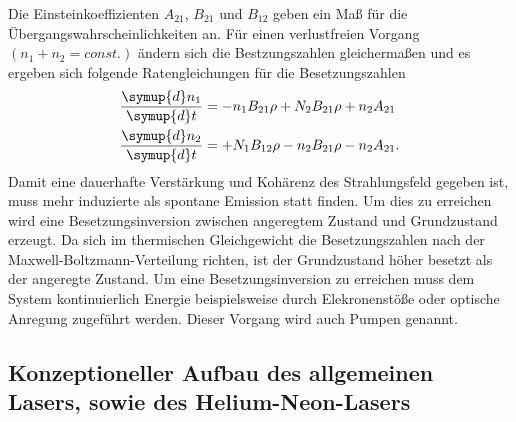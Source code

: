 Die Einsteinkoeffizienten $A_21$, $B_21$ und $B_12$
geben ein Maß für die Übergangswahrscheinlichkeiten an.
Für einen verlustfreien Vorgang
$(n_1+n_2=const.)$ ändern sich die Bestzungszahlen
gleichermaßen und es ergeben sich folgende
Ratengleichungen für die Besetzungszahlen
\begin{align}
\frac{\symup{d} n_1}{\symup{d} t} &=-n_1 B_{21}\rho + N_2 B_{21} \rho + n_2 A_{21}\\
\frac{\symup{d} n_2}{\symup{d} t} &=+N_1 B_{12}\rho - n_2 B_{21} \rho - n_2 A_{21}.
\end{align}
Damit eine dauerhafte Verstärkung
und Kohärenz des Strahlungsfeld gegeben ist,
muss mehr induzierte als spontane Emission
statt finden. Um dies zu
erreichen wird eine Besetzungsinversion
zwischen angeregtem Zustand und Grundzustand
erzeugt.
Da sich im thermischen Gleichgewicht
die Besetzungszahlen nach der
Maxwell-Boltzmann-Verteilung
richten, ist der Grundzustand höher
besetzt als der angeregte Zustand.
Um eine Besetzungsinversion zu erreichen
muss dem System kontinuierlich
Energie beispielsweise durch
Elekronenstöße oder
optische Anregung zugeführt werden.
Dieser Vorgang wird auch Pumpen genannt.



\subsection{Konzeptioneller Aufbau des allgemeinen Lasers,
sowie des Helium-Neon-Lasers}
\label{subsec:konzeptioneller_aufbau}

